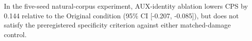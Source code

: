 In the five-seed natural-corpus experiment, AUX-identity ablation lowers CPS by 0.144 relative to the Original condition (95\% CI [-0.207, -0.085]), but does not satisfy the preregistered specificity criterion against either matched-damage control.
